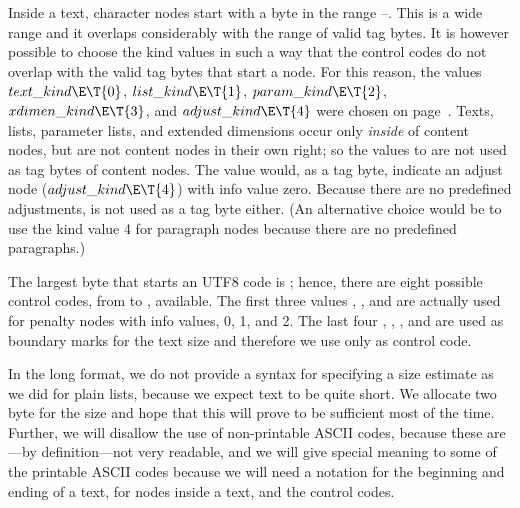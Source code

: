 Inside a text, character nodes start with a byte in the range --. This is a wide range
and it overlaps considerably with the range of valid tag bytes. It is however possible to choose
the kind values in such a way that the control codes do not overlap with the valid tag bytes that
start a node. For this reason, the values $\index{text kind+\\{text\_kind}}\\{text\_kind}\E\T{0}$, $\index{list kind+\\{list\_kind}}\\{list\_kind}\E\T{1}$, $\index{param kind+\\{param\_kind}}\\{param\_kind}\E\T{2}$,
$\index{xdimen kind+\\{xdimen\_kind}}\\{xdimen\_kind}\E\T{3}$, and $\\{adjust\_kind}\E\T{4}$ were chosen on page~\pageref{kinddef}.
Texts, lists, parameter lists, and extended dimensions occur only {\it inside} of content nodes, but
are not content nodes in their own right; so the values  to  are not used as tag bytes
of content nodes. The value  would, as a tag byte, indicate an adjust node ($\\{adjust\_kind}\E\T{4}$)
with info value zero. Because there are no predefined adjustments,   is not used as a tag byte either.
(An alternative choice would be to use the kind value 4 for paragraph nodes because there are no
predefined paragraphs.)

The largest byte that starts an UTF8 code is ; hence, there are eight possible control codes,
from  to , available.
The first three values  , , and  are actually used for penalty nodes
with info values, 0, 1, and 2. The last four  ,  ,  , and   are
used as boundary marks for the text size and therefore we use only  as control code.

In the long format, we do not provide a syntax for specifying a size estimate as we
did for plain lists, because we expect text to be quite short. We allocate two byte
for the size and hope that this will prove to be sufficient most of the time.
Further, we will disallow the use of non-printable
ASCII codes, because these are---by definition---not very readable, and we will
give special meaning to some of the printable ASCII codes because we will need
a notation for the beginning and ending of a text, for nodes inside a text,
and the control codes.

